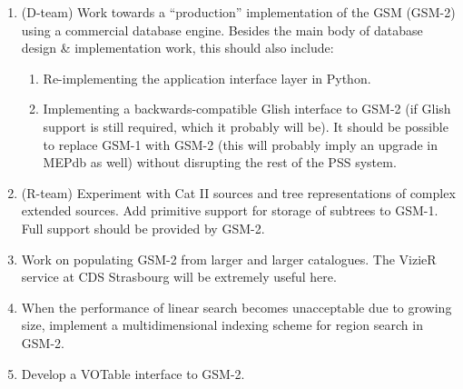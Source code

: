 \documentclass[]{lofar}
\begin{document}
  \begin{enumerate}
  \item (D-team) Work towards a ``production'' implementation of the GSM
  (GSM-2) using a commercial database engine. Besides the main body of database
  design \& implementation work, this should also include:
  
  \begin{enumerate}
  \item Re-implementing the application interface layer in Python.
  \item Implementing a backwards-compatible Glish interface to GSM-2 (if Glish support is
  still required, which it probably will be). It should be possible to replace
  GSM-1 with GSM-2 (this will probably imply an upgrade in MEPdb as well) 
  without disrupting the rest of the PSS system.
  \end{enumerate}
  
  \item (R-team) Experiment with Cat II sources and tree representations of
  complex extended sources. Add primitive support for storage of subtrees to
  GSM-1. Full support should be provided by GSM-2.
  
  \item Work on populating GSM-2 from larger and larger catalogues. The VizieR
  service at CDS Strasbourg \cite{vizier} will be extremely useful here.
  
  \item When the performance of linear search becomes unacceptable due to growing
  size, implement a multidimensional indexing scheme for region search in GSM-2.
  
  \item Develop a VOTable interface to GSM-2.
  \end{enumerate}
  
\end{document}
